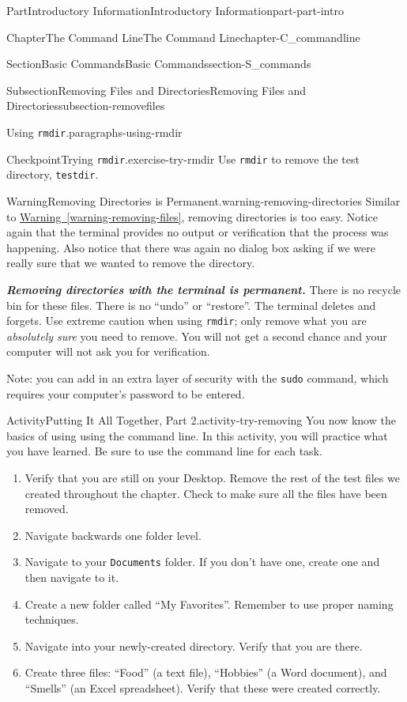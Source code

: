 \documentclass[oneside,10pt,]{book}
\newcommand{\xreffont}{\relax}
\newcommand{\mono}[1]{\texttt{#1}}
\newcommand{\alert}[1]{\textbf{\textit{#1}}}
\begin{document}
\begin{partptx}{Part}{Introductory Information}{}{Introductory Information}{}{}{part-part-intro}
\begin{chapterptx}{Chapter}{The Command Line}{}{The Command Line}{}{}{chapter-C_commandline}
\begin{sectionptx}{Section}{Basic Commands}{}{Basic Commands}{}{}{section-S_commands}
\begin{subsectionptx}{Subsection}{Removing Files and Directories}{}{Removing Files and Directories}{}{}{subsection-removefiles}
\begin{paragraphs}{Using \mono{rmdir}.}{paragraphs-using-rmdir}
\begin{inlineexercise}{Checkpoint}{Trying \mono{rmdir}.}{exercise-try-rmdir}%
Use \mono{rmdir} to remove the test directory, \mono{testdir}.%
\end{inlineexercise}%
\begin{warning}{Warning}{Removing Directories is Permanent.}{warning-removing-directories}%
%
Similar to \hyperref[warning-removing-files]{Warning~{\xreffont\ref{warning-removing-files}}}, removing directories is too easy. Notice again that the terminal provides no output or verification that the process was happening. Also notice that there was again no dialog box asking if we were really sure that we wanted to remove the directory.%
\par
\alert{Removing directories with the terminal is permanent.} There is no recycle bin for these files. There is no ``undo'' or ``restore''. The terminal deletes and forgets. Use extreme caution when using \mono{rmdir}; only remove what you are \emph{absolutely sure} you need to remove. You will not get a second chance and your computer will not ask you for verification.%
\par
Note: you can add in an extra layer of security with the \mono{sudo} command, which requires your computer's password to be entered.%
\end{warning}
\end{paragraphs}%
\begin{activity}{Activity}{Putting It All Together, Part 2.}{activity-try-removing}%
%
You now know the basics of using using the command line. In this activity, you will practice what you have learned. Be sure to use the command line for each task.%
\begin{enumerate}[font=\bfseries,label=(\alph*),ref=\alph*]%
\item{}Verify that you are still on your Desktop. Remove the rest of the test files we created throughout the chapter. Check to make sure all the files have been removed.%
\item{}Navigate backwards one folder level.%
\item{}Navigate to your \mono{Documents} folder. If you don't have one, create one and then navigate to it.%
\item{}Create a new folder called ``My Favorites''. Remember to use proper naming techniques.%
\item{}Navigate into your newly-created directory. Verify that you are there.%
\item{}Create three files: ``Food'' (a text file), ``Hobbies'' (a Word document), and ``Smells'' (an Excel spreadsheet). Verify that these were created correctly.%

\end{enumerate}
\end{activity}
\end{subsectionptx}
\end{sectionptx}
\end{chapterptx}
\end{partptx}
\end{document}

